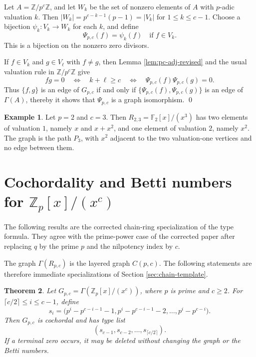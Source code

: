 \documentclass[12pt]{article}
\newtheorem{theorem}{Theorem}[section]
\theoremstyle{definition}
\newtheorem{example}[theorem]{Example}
\renewenvironment{proof}{{\bf \noindent Proof.}}{\qed}
\begin{document}
\begin{proof}
	Let $A=\mathbb{Z}/p^c\mathbb{Z}$, and let $W_k$ be the set of nonzero elements of $A$ with $p$-adic valuation $k$.  Then
	$ |W_k|=p^{c-k-1}(p-1)=|V_k| $
	for $1\leq k\leq c-1$.  Choose a bijection $\psi_k:V_k\to W_k$ for each $k$, and define
	$$
	\Psi_{p,c}(f)=\psi_k(f)\quad\text{if }f\in V_k.
	$$
	This is a bijection on the nonzero zero divisors.
	
	\medskip
	
	If $f\in V_k$ and $g\in V_\ell$ with $f\neq g$, then Lemma \ref{lem:pc-adj-revised} and the usual valuation rule in $\mathbb{Z}/p^c\mathbb{Z}$ give
	$$
	fg=0\quad\Longleftrightarrow\quad k+\ell\geq c\quad\Longleftrightarrow\quad \Psi_{p,c}(f)\Psi_{p,c}(g)=0.
	$$
	Thus $\{f,g\}$ is an edge of $G_{p,c}$ if and only if
	$\{\Psi_{p,c}(f),\Psi_{p,c}(g)\}$ is an edge of $\Gamma(A)$, thereby it shows that
	$\Psi_{p,c}$ is a graph isomorphism.
\end{proof}

\medskip

\begin{example}\label{ex:pc-23}
	Let $p=2$ and $c=3$.  Then $R_{2,3}=\mathbb F_2[x]/(x^3)$ has two elements of valuation $1$, namely $x$ and $x+x^2$, and one element of valuation $2$, namely $x^2$.  The graph is the path $P_3$, with $x^2$ adjacent to the two valuation-one vertices and no edge between them.
\end{example}

\medskip

\section{Cochordality and Betti numbers for \texorpdfstring{$\mathbb{Z}_p[x]/(x^c)$}{Z_p[x]/(x^c)}}\label{sec:pc-betti-section}
 The following results are the corrected chain-ring specialization of the type formula.  They agree with the prime-power case of the corrected paper after replacing $q$ by the prime $p$ and the nilpotency index by $c$.

\medskip

The graph $\Gamma(R_{p,c})$ is the layered graph $C(p,c)$.  The following statements are therefore immediate specializations of Section \ref{sec:chain-template}.

\medskip

\begin{theorem}\label{thm:pc-type-revised}
	Let $G_{p,c}=\Gamma(\mathbb{Z}_p[x]/(x^c))$, where $p$ is prime and $c\geq 2$.  For $\lceil c/2\rceil\leq i\leq c-1$, define
	$$
	s_i=\bigl(p^i-p^{c-i-1}-1,
	p^i-p^{c-i-1}-2,
	\ldots,
	p^i-p^{c-i}\bigr).
	$$
	Then $G_{p,c}$ is cochordal and has type list
	$$
	(s_{c-1},s_{c-2},\ldots,s_{\lceil c/2\rceil}).
	$$
	If a terminal zero occurs, it may be deleted without changing the graph or the Betti numbers.
\end{theorem}
\end{document}
